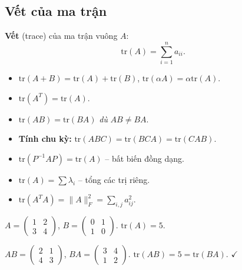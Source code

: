 \documentclass[12pt,a4paper]{article}
\begin{document}
\subsection{Vết của ma trận}

\begin{dinhnghia}
  \textbf{Vết} (trace) của ma trận vuông $A$:
  \[
    \mathrm{tr}(A) = \sum_{i=1}^n a_{ii}.
  \]
\end{dinhnghia}

\begin{tinhchat}[title={Tính chất vết}]
\begin{itemize}
  \item $\mathrm{tr}(A + B) = \mathrm{tr}(A) + \mathrm{tr}(B)$, $\mathrm{tr}(\alpha A) = \alpha \mathrm{tr}(A)$.
  \item $\mathrm{tr}(A^T) = \mathrm{tr}(A)$.
  \item $\mathrm{tr}(AB) = \mathrm{tr}(BA)$ \emph{dù} $AB \ne BA$.
  \item \textbf{Tính chu kỳ:} $\mathrm{tr}(ABC) = \mathrm{tr}(BCA) = \mathrm{tr}(CAB)$.
  \item $\mathrm{tr}(P^{-1}AP) = \mathrm{tr}(A)$ -- bất biến đồng dạng.
  \item $\mathrm{tr}(A) = \sum \lambda_i$ -- tổng các trị riêng.
  \item $\mathrm{tr}(A^T A) = \|A\|_F^2 = \sum_{i,j} a_{ij}^2$.
\end{itemize}
\end{tinhchat}

\begin{vidu}
$A = \begin{pmatrix}1&2\\ 3&4\end{pmatrix}$, $B = \begin{pmatrix}0&1\\ 1&0\end{pmatrix}$. $\mathrm{tr}(A) = 5$.

$AB = \begin{pmatrix}2 & 1\\ 4 & 3\end{pmatrix}$, $BA = \begin{pmatrix}3 & 4\\ 1 & 2\end{pmatrix}$. $\mathrm{tr}(AB) = 5 = \mathrm{tr}(BA)$. $\checkmark$
\end{vidu}
\end{document}
